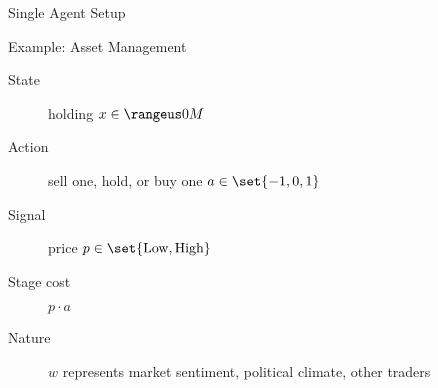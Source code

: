 \begin{frame}{Single Agent Setup}
\end{frame}
\begin{frame}{Example: Asset Management}

  \begin{description}
    \item[State] holding \(x \in \range{0}{M}\)
    \item[Action] sell one, hold, or buy one \(a \in \set{-1, 0, 1}\)
    \item[Signal] price \(p \in \set{\textnormal{Low}, \textnormal{High}}\)
    \item[Stage cost] \(p \cdot a\)
    \item[Nature] \(w\) represents market sentiment, political climate, \alert{other traders}
  \end{description}
\end{frame}
